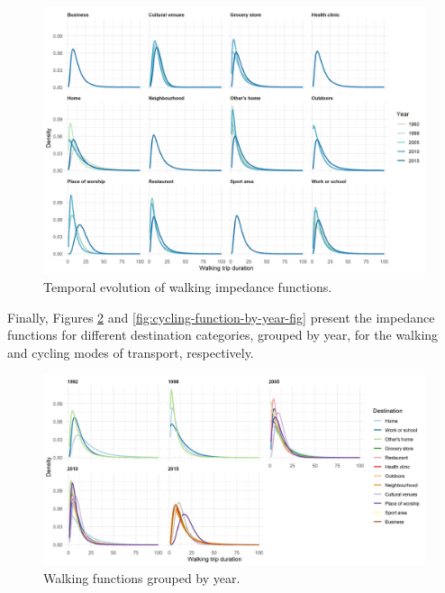 \documentclass[preprint, 3p,
authoryear]{elsarticle} %
\begin{document}
\begin{figure}

{\centering \includegraphics[width=1\linewidth]{figures/walking_temporal_evolution} 

}

\caption{Temporal evolution of walking impedance functions.}\label{fig:walking-evolution-fig}
\end{figure}

Finally, Figures \ref{fig:walking-function-by-year-fig} and
\ref{fig:cycling-function-by-year-fig} present the impedance functions
for different destination categories, grouped by year, for the walking
and cycling modes of transport, respectively.

\begin{figure}

{\centering \includegraphics[width=1\linewidth]{figures/walking_functions_by_year} 

}

\caption{Walking functions grouped by year.}\label{fig:walking-function-by-year-fig}
\end{figure}
\end{document}

